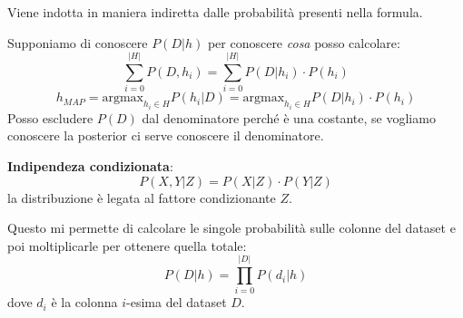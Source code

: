 Viene indotta in maniera indiretta dalle probabilità presenti nella formula.

Supponiamo di conoscere $P(D| h)$ per conoscere \textit{cosa} posso calcolare:
\begin{equation}
    \sum_{i = 0}^{|H|} P(D, h_i) = \sum_{i = 0}^{|H|} P(D|h_i) \cdot P(h_i)
\end{equation}
\begin{equation}
    h_{MAP} = \text{argmax}_{h_i \in H} P(h_i|D) = \text{argmax}_{h_i \in H} P(D|h_i) \cdot P(h_i)
\end{equation}
Posso escludere $P(D)$ dal denominatore perché è una costante, se vogliamo conoscere la posterior ci serve conoscere il denominatore.
\begin{definizione}
    \textbf{Indipendeza condizionata}:
    \begin{equation}
        P(X, Y|Z) = P(X|Z) \cdot P(Y|Z)
    \end{equation}
    la distribuzione è legata al fattore condizionante $Z$.
\end{definizione}
Questo mi permette di calcolare le singole probabilità sulle colonne del dataset e poi moltiplicarle per ottenere quella totale:
\begin{equation}
    P(D| h) = \prod_{i = 0}^{|D|} P(d_i|h)
\end{equation}
dove $d_i$ è la colonna $i$-esima del dataset $D$.
